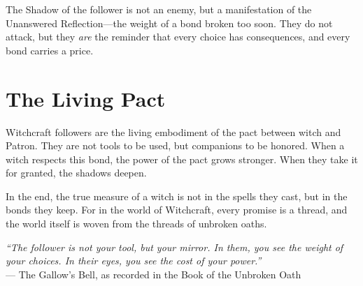 The Shadow of the follower is not an enemy, but a manifestation of the Unanswered Reflection---the weight of a bond broken too soon. They do not attack, but they \textit{are} the reminder that every choice has consequences, and every bond carries a price.

\section*{The Living Pact}

Witchcraft followers are the living embodiment of the pact between witch and Patron. They are not tools to be used, but companions to be honored. When a witch respects this bond, the power of the pact grows stronger. When they take it for granted, the shadows deepen.

In the end, the true measure of a witch is not in the spells they cast, but in the bonds they keep. For in the world of Witchcraft, every promise is a thread, and the world itself is woven from the threads of unbroken oaths.

\vspace{1em}
\noindent\textit{``The follower is not your tool, but your mirror. In them, you see the weight of your choices. In their eyes, you see the cost of your power.''} \\
--- The Gallow's Bell, as recorded in the Book of the Unbroken Oath





